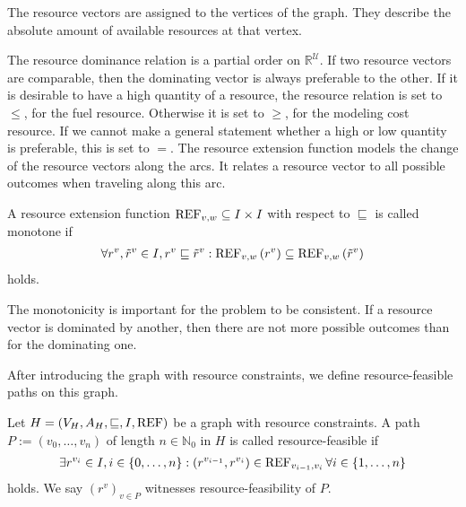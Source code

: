 The resource vectors are assigned to the vertices of the graph. They describe the absolute amount of available resources at that vertex.

The resource dominance relation is a partial order on $\mathbb{R}^{\mathcal{U}}$. If two resource vectors are comparable, then the dominating vector is always preferable to the other. If it is desirable to have a high quantity of a resource, the resource relation is set to $\leq$, \eg for the fuel resource. Otherwise it is set to $\geq$, \eg for the modeling cost resource. If we cannot make a general statement whether a high or low quantity is preferable, this is set to $=$. The resource extension function models the change of the resource vectors along the arcs. It relates a resource vector to all possible outcomes when traveling along this arc. 

\begin{definition}
\label{def:monotone_ref}

A resource extension function ${\operatorname{REF}_{v,w}\subseteq I\times I}$ with respect to $\sqsubseteq$ is called monotone if
\begin{align*}
	\forall r^v,\tilde{r}^v\in I, r^v\sqsubseteq\tilde{r}^v : \operatorname{REF}_{v,w}\left(r^v\right)\subseteq\operatorname{REF}_{v,w}\left(\tilde{r}^v\right)
\end{align*}
holds.

\end{definition}

The monotonicity is important for the problem to be consistent. If a resource vector is dominated by another, then there are not more possible outcomes than for the dominating one.

After introducing the graph with resource constraints, we define resource-feasible paths on this graph.

\begin{definition}

Let ${H=\left(V_H,A_H,\sqsubseteq,I,\operatorname{REF}\right)}$ be a graph with resource constraints. A path\linebreak
${P:=\left(v_0,\dots,v_n\right)}$ of length ${n\in\mathbb{N}_0}$ in $H$ is called resource-feasible if
\begin{align*}
	\exists r^{v_i}\in I,i\in\{0,\dots,n\}: \left(r^{v_{i-1}},r^{v_i}\right)\in\operatorname{REF}_{v_{i-1},v_i} \forall i\in\{1,\dots,n\}
\end{align*}
holds. We say $\left(r^v\right)_{v\in P}$ witnesses resource-feasibility of $P$.

\end{definition}

